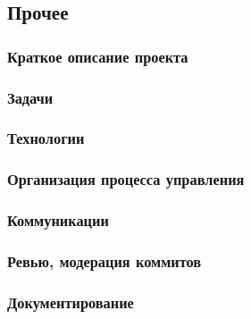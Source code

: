 \documentclass[a5paper]{article}
\begin{document}
\subsection{Прочее}

\subsubsection{Краткое описание проекта}

\subsubsection{Задачи}

\subsubsection{Технологии}

\subsubsection{Организация процесса управления}

\subsubsection{Коммуникации}

\subsubsection{Ревью, модерация коммитов}

\subsubsection{Документирование}
\end{document}
